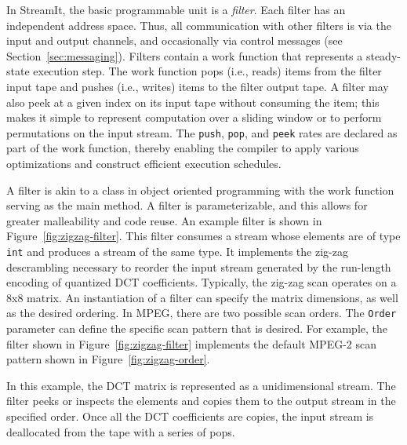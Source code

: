 In StreamIt, the basic programmable unit is a {\it filter}.  Each
filter has an independent address space. Thus, all communication with
other filters is via the input and output channels, and occasionally
via control messages (see Section~\ref{sec:messaging}).  Filters
contain a work function that represents a steady-state execution step.
The work function pops (i.e., reads) items from the filter input tape
and pushes (i.e., writes) items to the filter output tape. A filter
may also peek at a given index on its input tape without consuming the
item; this makes it simple to represent computation over a sliding
window or to perform permutations on the input stream. The {\tt push},
{\tt pop}, and {\tt peek} rates are declared as part of the work
function, thereby enabling the compiler to apply various optimizations
and construct efficient execution schedules.

A filter is akin to a class in object oriented programming with the
work function serving as the main method. A filter is parameterizable,
and this allows for greater malleability and code reuse. An example
filter is shown in Figure~\ref{fig:zigzag-filter}. This filter
consumes a stream whose elements are of type {\tt int} and produces a
stream of the same type. It implements the zig-zag descrambling
necessary to reorder the input stream generated by the run-length
encoding of quantized DCT coefficients. Typically, the zig-zag scan
operates on a 8x8 matrix. An instantiation of a filter can specify the
matrix dimensions, as well as the desired ordering. In MPEG, there are
two possible scan orders. The {\tt Order} parameter can define the
specific scan pattern that is desired. For example, the filter shown
in Figure~\ref{fig:zigzag-filter} implements the default MPEG-2 scan
pattern shown in Figure~\ref{fig:zigzag-order}.

In this example, the DCT matrix is represented as a unidimensional
stream. The filter peeks or inspects the elements and copies them to
the output stream in the specified order. Once all the DCT
coefficients are copies, the input stream is deallocated from the tape
with a series of pops.

